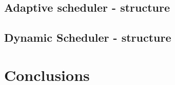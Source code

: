 \documentclass[]{scrartcl}
\begin{document}




\subsection{Adaptive scheduler -  structure}



\subsection{Dynamic Scheduler - structure}



\section{Conclusions}
\label{sec:conclusions}



\end{document}
